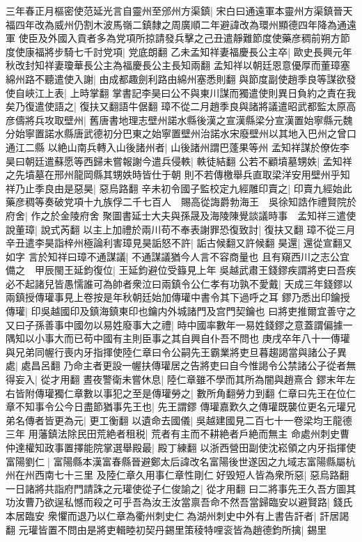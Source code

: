 三年春正月樞密使范延光言自靈州至邠州方渠鎮|{
	宋白曰通遠軍本靈州方渠鎮晉天福四年改為威州仍割木波馬嶺二鎮隸之周廣順二年避諱改為環州顯德四年降為通遠軍}
使臣及外國入貢者多為党項所掠請發兵擊之己丑遣靜難節度使藥彦稠前朔方節度使康福將步騎七千討党項|{
	党底朗翻}
乙未孟知祥妻福慶長公主卒|{
	歐史長興元年秋改封知祥妻瓊華長公主為福慶長公主長知兩翻}
孟知祥以朝廷恩意優厚而董璋塞綿州路不聽遣使入謝|{
	由成都趣劍利路由綿州塞悉則翻}
與節度副使趙季良等謀欲發使自峽江上表|{
	上時掌翻}
掌書記李昊曰公不與東川謀而獨遣使則異日負約之責在我矣乃復遣使語之|{
	復扶又翻語牛倨翻}
璋不從二月趙季良與諸將議遣昭武都監太原高彦儔將兵攻取壁州|{
	舊唐書地理志壁州諾水縣後漢之宣漢縣梁分宣漢置始寧縣元魏分始寧置諾水縣唐武德初分巴東之始寧置壁州治諾水宋廢壁州以其地入巴州之曾口通江二縣}
以絶山南兵轉入山後諸州者|{
	山後諸州謂巴蓬果等州}
孟知祥謀於僚佐李昊曰朝廷遣蘇愿等西歸未嘗報謝今遣兵侵軼|{
	軼徒結翻}
公若不顧墳墓甥妷|{
	孟知祥之先墳墓在邢州龍岡縣其甥妷時皆仕于朝}
則不若傳檄舉兵直取梁洋安用壁州乎知祥乃止季良由是惡昊|{
	惡烏路翻}
辛未初令國子監校定九經雕印賣之|{
	印賣九經始此}
藥彦稠等奏破党項十九族俘二千七百人　賜高從誨爵勃海王　吳徐知誥作禮賢院於府舍|{
	作之於金陵府舍}
聚圖書延士大夫與孫晟及海陵陳覺談議時事　孟知祥三遣使說董璋|{
	說式芮翻}
以主上加禮於兩川苟不奉表謝罪恐復致討|{
	復扶又翻}
璋不從三月辛丑遣李昊詣梓州極論利害璋見昊詬怒不許|{
	詬古候翻又許候翻}
昊還|{
	還從宣翻又如字}
言於知祥曰璋不通謀議|{
	不通謀議猶今人言不容商量也}
且有窺西川之志公宜備之　甲辰閩王延鈞復位|{
	王延鈞避位受籙見上年}
吳越武肅王錢鏐疾謂將吏曰吾疾必不起諸兒皆愚懦誰可為帥者衆泣曰兩鎮令公仁孝有功孰不愛戴|{
	天成三年錢鏐以兩鎮授傳瓘事見上卷按是年秋朝廷始加傳瓘中書令其下過呼之耳}
鏐乃悉出印鑰授傳瓘|{
	印吳越國印及鎮海鎮東印也鑰内外城諸門及宫門契鑰也}
曰將吏推爾宜善守之又曰子孫善事中國勿以易姓廢事大之禮|{
	時中國率數年一易姓錢鏐之意蓋謂偏據一隅知以小事大而已苟中國有主則臣事之其自興自仆吾不問也}
庚戌卒年八十一傳瓘與兄弟同幄行喪内牙指揮使陸仁章曰令公嗣先王霸業將吏旦暮趨謁當與諸公子異處|{
	處昌呂翻}
乃命主者更設一幄扶傳瓘居之告將吏曰自今惟謁令公禁諸公子從者無得妄入|{
	從才用翻}
晝夜警衛未嘗休息|{
	陸仁章雖不學而其所為闇與趙熹合}
鏐末年左右皆附傳瓘獨仁章數以事犯之至是傳瓘勞之|{
	數所角翻勞力到翻}
仁章曰先王在位仁章不知事令公今日盡節猶事先王也|{
	先王謂鏐}
傳瓘嘉歎久之傳瓘既襲位更名元瓘兄弟名傳者皆更為元|{
	更工衡翻}
以遺命去國儀|{
	吳越建國見二百七十一卷梁均王龍德三年}
用藩鎮法除民田荒絶者租税|{
	荒者有主而不耕絶者戶絶而無主}
命處州刺史曹仲達權知政事置擇能院掌選舉殿最|{
	殿丁練翻}
以浙西營田副使沈崧領之内牙指揮使富陽劉仁|{
	富陽縣本漢富春縣晉避鄭太后諱改名富陽後世遂因之九域志富陽縣屬杭州在州西南七十三里}
及陸仁章久用事仁章性剛仁好毁短人皆為衆所惡|{
	惡烏路翻}
一日諸將共詣府門請誅之元瓘使從子仁俊諭之|{
	從才用翻}
曰二將事先王久吾方圖其功汝曹乃欲逞私憾而殺之可乎吾為汝王汝當禀吾命不然吾當歸臨安以避賢路|{
	錢氏本居臨安}
衆懼而退乃以仁章為衢州刺史仁為湖州刺史中外有上書告訐者|{
	訐居謁翻}
元瓘皆置不問由是將吏輯睦初契丹錫里策稜特哩衮皆為趙德鈞所擒|{
	錫里}



